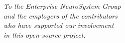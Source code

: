 \cleardoublepage
\thispagestyle{empty}
\begin{center}
\Large\itshape
To the Enterprise NeuroSystem Group\\
and the employers of the contributors \\
who have supported our involvement \\
in this open-source project.
\end{center}
